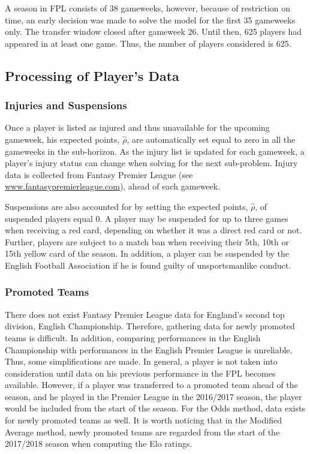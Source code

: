 \newpar

A season in FPL consists of 38 gameweeks, however, because of restriction on time, an early decision was made to solve the model for the first 35 gameweeks only. The transfer window closed after gameweek 26. Until then, 625 players had appeared in at least one game. Thus, the number of players considered is 625.

\subsection{Processing of Player's Data}

\subsubsection{Injuries and Suspensions}
Once a player is listed as injured and thus unavailable for the upcoming gameweek, his expected points, $\hat{\rho}$, are automatically set equal to zero in all the gameweeks in the sub-horizon. As the injury list is updated for each gameweek, a player's injury status can change when solving for the next sub-problem. Injury data is collected from Fantasy Premier League (see \url{www.fantasypremierleague.com}), ahead of each gameweek. 

\newpar

Suspensions are also accounted for by setting the expected points, $\hat{\rho}$, of suspended players equal 0. A player may be suspended for up to three games when receiving a red card, depending on whether it was a direct red card or not. Further, players are subject to a match ban when receiving their 5th, 10th or 15th yellow card of the season. In addition, a player can be suspended by the English Football Association if he is found guilty of unsportsmanlike conduct. 


\subsubsection{Promoted Teams}

There does not exist Fantasy Premier League data for England's second top division, English Championship. Therefore, gathering data for newly promoted teams is difficult. In addition, comparing performances in the English Championship with performances in the English Premier League is unreliable. Thus, some simplifications are made. In general, a player is not taken into consideration until data on his previous performance in the FPL becomes available. However, if a player was transferred to a promoted team ahead of the season, and he played in the Premier League in the 2016/2017 season, the player would be included from the start of the season. For the Odds method, data exists for newly promoted teams as well. It is worth noticing that in the Modified Average method, newly promoted teams are regarded from the start of the 2017/2018 season when computing the Elo ratings. 

